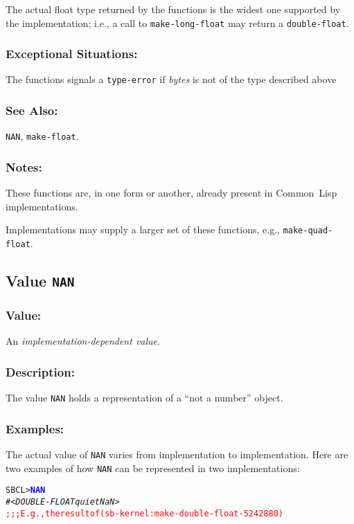\documentclass[fleqn]{article}
\newcommand{\CL}{\textsf{Common~Lisp}}
\newcommand{\code}[1]{\texttt{#1}}
\newcommand{\varname}[1]{\textit{#1}}
\newcommand{\codeprompt}[1]{\textcolor{blue}{\textbf{#1}}}
\newcommand{\DDictionaryItem}[1]{\vspace*{6pt}\noindent\hrulefill\vspace*{-9pt}\subsection*{#1}}
\begin{document}
The actual float type returned by the functions is the widest one
supported by the implementation; i.e., a call to
\code{make-long-float} may return a \code{double-float}.

\subsubsection*{Exceptional Situations:}

The functions signals a \code{type-error} if \varname{bytes} is not of
the type described above

\subsubsection*{See Also:}

\code{NAN}, \code{make-float}.

\subsubsection*{Notes:}

These functions are, in one form or another, already present in \CL{}
implementations.

Implementations may supply a larger set of these functions, e.g.,
\code{make-quad-float}.


\DDictionaryItem{Value \code{NAN}}

\subsubsection*{Value:}

An \emph{implementation-dependent value}.


\subsubsection*{Description:}

The value \code{NAN} holds a representation of a ``not a number'' object.


\subsubsection*{Examples:}

The actual value of \code{NAN} varies from implementation to
implementation.  Here are two examples of how \code{NAN} can be
represented in two implementations:

\begin{alltt}
SBCL> \codeprompt{NAN}
\textit{#<DOUBLE-FLOAT quiet NaN>}
\textcolor{red}{;;; E.g., the result of (sb-kernel:make-double-float -524288 0)}
\end{alltt}
\end{document}
